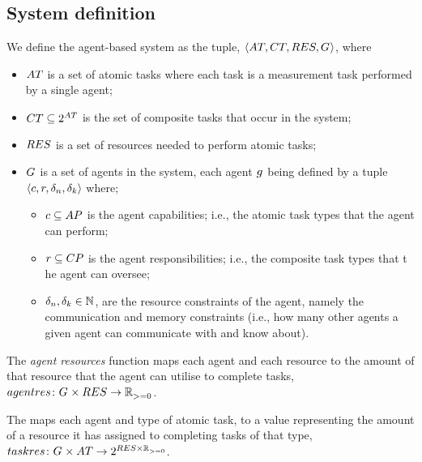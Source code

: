 \subsection{System definition}
We define the agent-based system as the tuple, $\langle 
	\setAtomicTask{}{},
	\setCompositeTask{}{},
	\setResource{}{},
	\setAgents{}{}
\rangle$, where
\begin{itemize}
	\item $\setAtomicTask{}{}$ is a set of atomic tasks where each task is a measurement task performed by a single agent;
	\item $\setCompositeTask{}{} \subseteq \powerSetSymbol{\setAtomicTask{}{}}{}{}$ is the set of composite tasks that occur in the system;
	\item $\setResource{}{}$ is a set of resources needed to perform atomic tasks;
	\item $G_{}^{}$ is a set of agents in the system, each agent $g_{}^{}$ being defined by a tuple $\langle c,r, \delta_n, \delta_k \rangle$ where;
	\begin{itemize}
		\item $\varAgentCapability{}{}\subseteq \setAtomicTaskType{}{}$ is the agent capabilities; i.e., the atomic task types that the agent can perform;
		 \item $\varAgentResponsiblity{}{} \subseteq \setCompositeTaskType{}{}$ is the agent responsibilities; i.e., the composite task types that t    he agent can oversee;
		\item $\delta_n, \delta_k \in \mathbb{N}$, are the resource constraints of the agent, namely the communication and memory constraints (i.e., how many other agents a given agent can communicate with and know about).
	\end{itemize}
\end{itemize}




\newcommand{\formalAgentResources}[2]{
	\functionFormal{agentres}
	{\setAgents{}{} \times \setResource{}{}}
	{\setRealNumbersNonNegative{}{}}
}
\newcommand{\functionAgentResources}[2]{
	\functionSignature{agentres}{\varAgent{}{}, \varResource{}{}}
}
The \textit{agent resources} function maps each agent and each resource to the amount of that resource that the agent can utilise to complete tasks, $\formalAgentResources{}{}$.

\newcommand{\formalTaskResourceAllocation}[2]{
	\functionFormal{taskres}
	{\setAgents{}{} \times \setAtomicTask{}{}}
	{\powerSetSymbol{\setResource{}{} \times \setRealNumbersNonNegative{}  {}}{}{}}
}
\newcommand{\functionTaskResourceAllocation}[2]{
	\functionSignature{taskres}
	{\varAgent{}{}, \varAtomicTask{}{}}
}
The  maps each agent and type of atomic task, to a value representing the amount of a resource it has assigned to completing tasks of that type, $\formalTaskResourceAllocation{}{}$.

